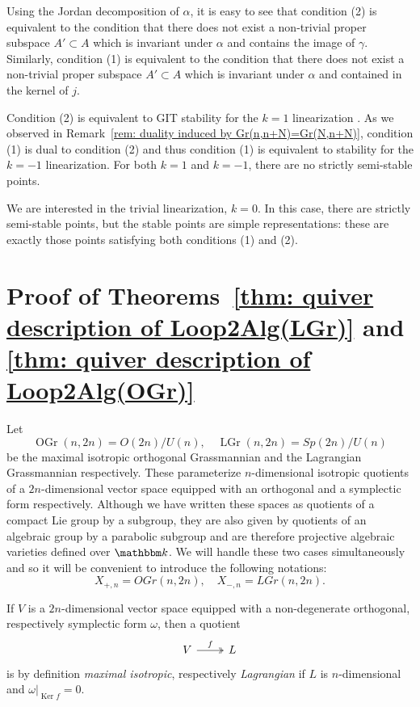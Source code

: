 \documentclass{amsart}
\theoremstyle{definition}
\newcommand{\kk} {{\mathbbm k}}
\newcommand{\Ker}{\operatorname{Ker}}
\newcommand{\LGr}{\operatorname{LGr}}
\newcommand{\OGr}{\operatorname{OGr}}
\begin{document}
Using the Jordan decomposition of $\alpha$, it is easy to see that
condition (2) is equivalent to the condition that there does not exist
a non-trivial proper subspace $A'\subset A$ which is invariant under
$\alpha$ and contains the image of $\gamma$. Similarly, condition (1)
is equivalent to the condition that there does not exist a non-trivial
proper subspace $A'\subset A$ which is invariant under $\alpha$ and
contained in the kernel of $j$.


Condition (2) is equivalent to GIT stability for the $k=1$
linearization \cite[Def.~2.2]{Nakajima-Handsaw}. As we observed in
Remark~\ref{rem: duality induced by Gr(n,n+N)=Gr(N,n+N)}, condition
(1) is dual to condition (2) and thus condition (1) is equivalent to
stability for the $k=-1$ linearization. For both $k=1$ and $k=-1$,
there are no strictly semi-stable points.

We are interested in the trivial linearization, $k=0$. In this case,
there are strictly semi-stable points, but the stable points are simple
representations: these are exactly those points satisfying both
conditions (1) and (2).

\section{Proof of Theorems~\ref{thm: quiver description of
Loop2Alg(LGr)} and \ref{thm: quiver description of
Loop2Alg(OGr)}}\label{sec: proofs of the Omega2(LG/OG) theorems}

Let 
\[
 \OGr (n,2n) = O(2n)/U(n), \quad \LGr (n,2n) = Sp(2n)/U(n)
\]
be the maximal isotropic orthogonal Grassmannian and the Lagrangian
Grassmannian respectively. These parameterize $n$-dimensional
isotropic quotients of a $2n$-dimensional vector space equipped with
an orthogonal and a symplectic form respectively. Although we have
written these spaces as quotients of a compact Lie group by a
subgroup, they are also given by quotients of an algebraic group by a
parabolic subgroup and are therefore projective algebraic varieties
defined over $\kk$. We will handle these two cases simultaneously and
so it will be convenient to introduce the following notations:
\[
X_{+,n} = OGr(n,2n), \quad X_{-,n} = LGr(n,2n).
\]

If $V$ is a $2n$-dimensional vector space equipped with a
non-degenerate orthogonal, respectively symplectic form $\omega$, then a
quotient
\[
\begin{tikzcd}
V \arrow[r,  two heads, "f"] & L
\end{tikzcd}
\]
is by definition \emph{maximal isotropic}, respectively \emph{Lagrangian} if $L$ is
$n$-dimensional and $\omega |_{\Ker f} = 0$. 
\end{document}
